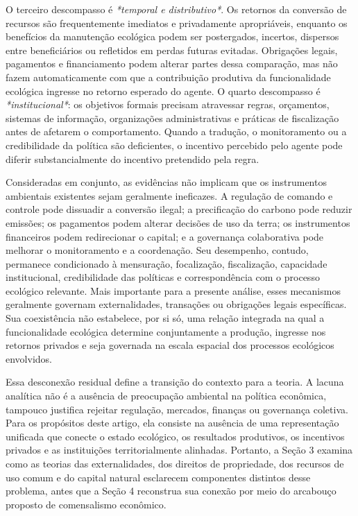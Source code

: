 O terceiro descompasso é \textit{*temporal e distributivo*}. Os retornos da conversão de recursos são frequentemente imediatos e privadamente apropriáveis, enquanto os benefícios da manutenção ecológica podem ser postergados, incertos, dispersos entre beneficiários ou refletidos em perdas futuras evitadas. Obrigações legais, pagamentos e financiamento podem alterar partes dessa comparação, mas não fazem automaticamente com que a contribuição produtiva da funcionalidade ecológica ingresse no retorno esperado do agente. O quarto descompasso é \textit{*institucional*}: os objetivos formais precisam atravessar regras, orçamentos, sistemas de informação, organizações administrativas e práticas de fiscalização antes de afetarem o comportamento. Quando a tradução, o monitoramento ou a credibilidade da política são deficientes, o incentivo percebido pelo agente pode diferir substancialmente do incentivo pretendido pela regra.

Consideradas em conjunto, as evidências não implicam que os instrumentos ambientais existentes sejam geralmente ineficazes. A regulação de comando e controle pode dissuadir a conversão ilegal; a precificação do carbono pode reduzir emissões; os pagamentos podem alterar decisões de uso da terra; os instrumentos financeiros podem redirecionar o capital; e a governança colaborativa pode melhorar o monitoramento e a coordenação. Seu desempenho, contudo, permanece condicionado à mensuração, focalização, fiscalização, capacidade institucional, credibilidade das políticas e correspondência com o processo ecológico relevante. Mais importante para a presente análise, esses mecanismos geralmente governam externalidades, transações ou obrigações legais específicas. Sua coexistência não estabelece, por si só, uma relação integrada na qual a funcionalidade ecológica determine conjuntamente a produção, ingresse nos retornos privados e seja governada na escala espacial dos processos ecológicos envolvidos.

Essa desconexão residual define a transição do contexto para a teoria. A lacuna analítica não é a ausência de preocupação ambiental na política econômica, tampouco justifica rejeitar regulação, mercados, finanças ou governança coletiva. Para os propósitos deste artigo, ela consiste na ausência de uma representação unificada que conecte o estado ecológico, os resultados produtivos, os incentivos privados e as instituições territorialmente alinhadas. Portanto, a Seção 3 examina como as teorias das externalidades, dos direitos de propriedade, dos recursos de uso comum e do capital natural esclarecem componentes distintos desse problema, antes que a Seção 4 reconstrua sua conexão por meio do arcabouço proposto de comensalismo econômico.

